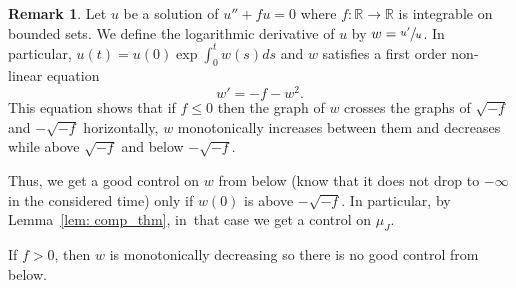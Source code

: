 \documentclass[JEP,XML,SOM,Unicode,NoFloatCountersInSection]{cedram}
\theoremstyle{definition}
\newtheorem{remark}[theorem]{Remark}
\renewcommand{\>}{{\rangle}}
\newcommand{\<}{{\langle}}
\begin{document}
\begin{remark}\label{rem: behavior of Riccati solution}
Let $u$ be a solution of $u''+fu=0$ where $f\colon \mathbb R\to\mathbb R$ is integrable on bounded sets. We define the logarithmic derivative of $u$ by $w=\sfrac{u'}{u}$. In particular, $u(t)=u(0)\exp{\int_0^t}w(s)ds$ and $w$ satisfies a first order non-linear equation
\[
w'=-f-w^2.
\]
This equation shows that if $f\leq 0$ then the graph of $w$ crosses the graphs of $\sqrt{-f}$ and $-\sqrt{-f}$ horizontally, $w$ monotonically increases between them and decreases while above $\sqrt{-f}$ and below $-\sqrt{-f}$.

Thus, we get a good control on $w$ from below (know that it does not drop to $-\infty$ in the considered time) only if $w(0)$ is above $-\sqrt{-f}$. In particular, by Lemma~\ref{lem: comp_thm}, in~that case we get a control on $\mu_J$.

If $f>0$, then $w$ is monotonically decreasing so there is no good control from below.
\end{remark}
\end{document}
